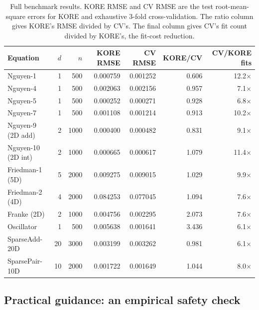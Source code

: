 \documentclass{article}
\newcommand{\KORE}{\textsc{KORE}}
\begin{document}
\begin{table}[t]
\caption{Full benchmark results. KORE RMSE and CV RMSE are the test root-mean-square errors for \KORE{} and exhaustive $3$-fold cross-validation. The ratio column gives \KORE{}'s RMSE divided by CV's. The final column gives CV's fit count divided by \KORE{}'s, the fit-cost reduction.}
\label{tab:benchmark_table}
\centering
\small
\begin{tabular}{@{}lrrrrrr@{}}
\toprule
Equation & $d$ & $n$ & KORE RMSE & CV RMSE & KORE/CV & CV/KORE fits \\
\midrule
Nguyen-1 & 1 & 500 & 0.000759 & 0.001252 & 0.606 & 12.2$\times$ \\
Nguyen-4 & 1 & 500 & 0.002063 & 0.002156 & 0.957 & 7.1$\times$ \\
Nguyen-5 & 1 & 500 & 0.000252 & 0.000271 & 0.928 & 6.8$\times$ \\
Nguyen-7 & 1 & 500 & 0.001108 & 0.001214 & 0.913 & 10.2$\times$ \\
Nguyen-9 (2D add) & 2 & 1000 & 0.000400 & 0.000482 & 0.831 & 9.1$\times$ \\
Nguyen-10 (2D int) & 2 & 1000 & 0.000665 & 0.000617 & 1.079 & 11.4$\times$ \\
Friedman-1 (5D) & 5 & 2000 & 0.009275 & 0.009015 & 1.029 & 9.9$\times$ \\
Friedman-2 (4D) & 4 & 2000 & 0.084253 & 0.077045 & 1.094 & 7.6$\times$ \\
Franke (2D) & 2 & 1000 & 0.004756 & 0.002295 & 2.073 & 7.6$\times$ \\
Oscillator & 1 & 500 & 0.005638 & 0.001641 & 3.436 & 6.1$\times$ \\
SparseAdd-20D & 20 & 3000 & 0.003199 & 0.003262 & 0.981 & 6.1$\times$ \\
SparsePair-10D & 10 & 2000 & 0.001722 & 0.001649 & 1.044 & 8.0$\times$ \\
\bottomrule
\end{tabular}
\end{table}

\subsection{Practical guidance: an empirical safety check}
\label{sec:applicability}
\end{document}
